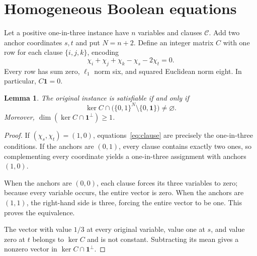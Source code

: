\documentclass[11pt]{article}
\newtheorem{lemma}[theorem]{Lemma}
\newcommand{\one}{\mathbf 1}
\begin{document}
\section{Homogeneous Boolean equations}
Let a positive one-in-three instance have $n$ variables and clauses $\mathcal C$. Add two anchor coordinates $s,t$ and put $N=n+2$. Define an integer matrix $C$ with one row for each clause $\{i,j,k\}$, encoding
\begin{equation}\label{eq:clause}
 \chi_i+\chi_j+\chi_k-\chi_s-2\chi_t=0.
\end{equation}
Every row has sum zero, $\ell_1$ norm six, and squared Euclidean norm eight. In particular, $C\one=0$.

\begin{lemma}\label{lem:boolean}
The original instance is satisfiable if and only if
\[
 \ker C\cap\bigl(\{0,1\}^N\setminus\{0,\one\}\bigr)\ne\varnothing.
\]
Moreover, $\dim(\ker C\cap\one^\perp)\geq1$.
\end{lemma}
\begin{proof}
If $(\chi_s,\chi_t)=(1,0)$, equations~\eqref{eq:clause} are precisely the one-in-three conditions. If the anchors are $(0,1)$, every clause contains exactly two ones, so complementing every coordinate yields a one-in-three assignment with anchors $(1,0)$.

When the anchors are $(0,0)$, each clause forces its three variables to zero; because every variable occurs, the entire vector is zero. When the anchors are $(1,1)$, the right-hand side is three, forcing the entire vector to be one. This proves the equivalence.

The vector with value $1/3$ at every original variable, value one at $s$, and value zero at $t$ belongs to $\ker C$ and is not constant. Subtracting its mean gives a nonzero vector in $\ker C\cap\one^\perp$.
\end{proof}
\end{document}
